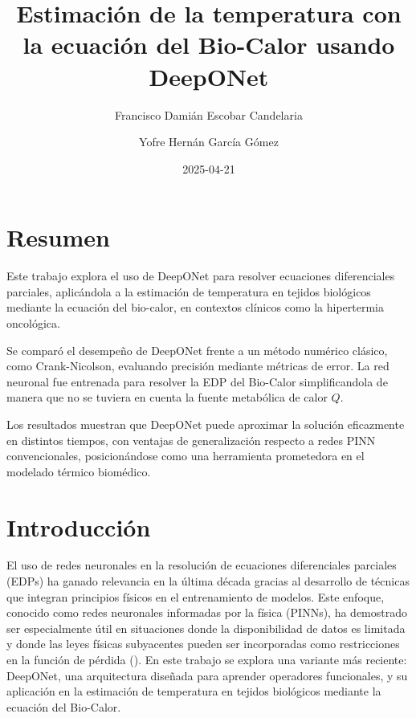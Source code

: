 \documentclass[
  spanish,
  us-letterpaper,
  DIV=11,
  numbers=noendperiod]{scrreprt}
\title{Estimación de la temperatura con la ecuación del Bio-Calor usando
DeepONet}
\author{Francisco Damián Escobar Candelaria \and Yofre Hernán García
Gómez}
\date{2025-04-21}
\renewcommand*\contentsname{Tabla de contenidos}
\newcommand\contentsname{Tabla de contenidos}
\theoremstyle{plain}
\theoremstyle{definition}
\theoremstyle{remark}
\begin{document}
\maketitle

\renewcommand*\contentsname{Tabla de contenidos}
{
\hypersetup{linkcolor=}
\setcounter{tocdepth}{2}
\tableofcontents
}


\chapter*{Resumen}\label{resumen}


Este trabajo explora el uso de DeepONet para resolver ecuaciones
diferenciales parciales, aplicándola a la estimación de temperatura en
tejidos biológicos mediante la ecuación del bio-calor, en contextos
clínicos como la hipertermia oncológica.

Se comparó el desempeño de DeepONet frente a un método numérico clásico,
como Crank-Nicolson, evaluando precisión mediante métricas de error. La
red neuronal fue entrenada para resolver la EDP del Bio-Calor
simplificandola de manera que no se tuviera en cuenta la fuente
metabólica de calor \(Q\).

Los resultados muestran que DeepONet puede aproximar la solución
eficazmente en distintos tiempos, con ventajas de generalización
respecto a redes PINN convencionales, posicionándose como una
herramienta prometedora en el modelado térmico biomédico.


\chapter{Introducción}\label{introducciuxf3n}

El uso de redes neuronales en la resolución de ecuaciones diferenciales
parciales (EDPs) ha ganado relevancia en la última década gracias al
desarrollo de técnicas que integran principios físicos en el
entrenamiento de modelos. Este enfoque, conocido como redes neuronales
informadas por la física (PINNs), ha demostrado ser especialmente útil
en situaciones donde la disponibilidad de datos es limitada y donde las
leyes físicas subyacentes pueden ser incorporadas como restricciones en
la función de pérdida (). En este trabajo se explora una variante más
reciente: DeepONet, una arquitectura diseñada para aprender operadores
funcionales, y su aplicación en la estimación de temperatura en tejidos
biológicos mediante la ecuación del Bio-Calor.
\end{document}
